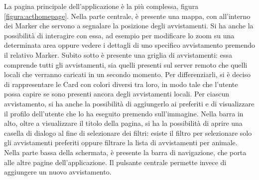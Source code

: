 \documentclass[a4paper,final,12pt]{report}
\begin{document}
La pagina principale dell'applicazione è la più complessa, figura \ref{figura:acthomepage}. Nella parte centrale, è presente una mappa, con all'interno dei Marker che servono a segnalare la posizione degli avvistamenti. Si ha anche la possibilità di interagire con essa, ad esempio per modificare lo zoom su una determinata area oppure vedere i dettagli di uno specifico avvistamento premendo il relativo Marker. Subito sotto è presente una griglia di avvistamenti: essa comprende tutti gli avvistamenti, sia quelli presenti sul server remoto che quelli locali che verranno caricati in un secondo momento. Per differenziarli, si è deciso di rappresentare le Card con colori diversi tra loro, in modo tale che l'utente possa capire se sono presenti ancora degli avvistamenti locali. Per ciascun avvistamento, si ha anche la possibilità di aggiungerlo ai preferiti e di visualizzare il profilo dell'utente che lo ha eseguito premendo sull'immagine.
Nella barra in alto, oltre a visualizzare il titolo della pagina, si ha la possibilità di aprire una casella di dialogo al fine di selezionare dei filtri: esiste il filtro per selezionare solo gli avvistamenti preferiti oppure filtrare la lista di avvistamenti per animale.\\
Nella parte bassa della schermata, è presente la barra di navigazione, che porta alle altre pagine dell'applicazione. Il pulsante centrale permette invece di aggiungere un nuovo avvistamento.
\end{document}
